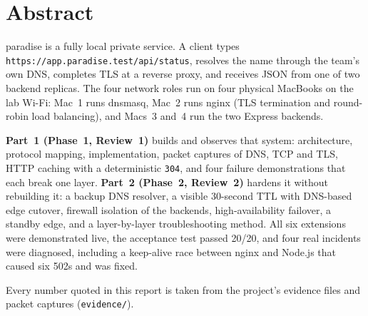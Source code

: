 \documentclass[11pt,a4paper]{article}
\begin{document}
\tableofcontents
\newpage

\section{Abstract}
paradise is a fully local private service. A client types
\texttt{https://app.paradise.test/api/status}, resolves the name through the team's own DNS,
completes TLS at a reverse proxy, and receives JSON from one of two backend replicas. The four
network roles run on four physical MacBooks on the lab Wi-Fi: Mac~1 runs dnsmasq, Mac~2 runs
nginx (TLS termination and round-robin load balancing), and Macs~3 and~4 run the two Express
backends.

\textbf{Part~1 (Phase~1, Review~1)} builds and observes that system: architecture, protocol
mapping, implementation, packet captures of DNS, TCP and TLS, HTTP caching with a deterministic
\texttt{304}, and four failure demonstrations that each break one layer.
\textbf{Part~2 (Phase~2, Review~2)} hardens it without rebuilding it: a backup DNS resolver, a
visible 30-second TTL with DNS-based edge cutover, firewall isolation of the backends,
high-availability failover, a standby edge, and a layer-by-layer troubleshooting method. All six
extensions were demonstrated live, the acceptance test passed 20/20, and four real incidents were
diagnosed, including a keep-alive race between nginx and Node.js that caused six 502s and was fixed.

Every number quoted in this report is taken from the project's evidence files and packet captures (\texttt{evidence/}).
\end{document}

